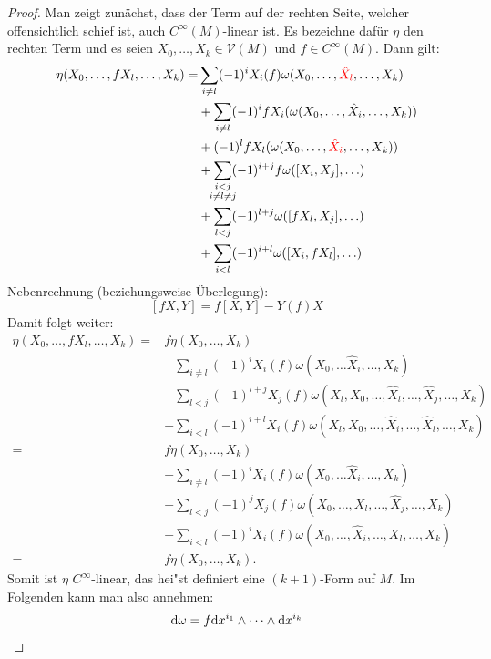 \begin{proof}
Man zeigt zunächst, dass der Term auf der rechten Seite, welcher offensichtlich schief ist, auch $C^{\infty}(M)$-linear ist.
Es bezeichne dafür $\eta$ den rechten Term und es seien $X_0, \ldots, X_k \in \mathcal V(M)$ und $f \in C^{\infty}(M)$. Dann gilt:
\begin{align*}
    \eta(X_0,\ldots,fX_l,\ldots, X_k) = & \sum_{i \neq l}(-1)^iX_i(f) \omega(X_0,\ldots, \textcolor{red}{\hat X_l}, \ldots, X_k)\\
& + \sum_{i \neq l}(-1)^ifX_i(\omega(X_0,\ldots, \hat X_i, \ldots, X_k))\\
& + (-1)^lfX_l(\omega(X_0, \ldots, \textcolor{red}{\hat X_i}, \ldots, X_k))\\ %
& + \sum_{\mathclap{\substack{i < j \\ i\ne l \ne j }}}(-1)^{i+j}f\omega([X_i,X_j], \ldots )\\ %
& + \sum_{l < j}(-1)^{l+j}\omega([fX_l,X_j], \ldots )\\
& + \sum_{i<l}(-1)^{i+l}\omega([X_i,fX_l], \ldots )
  \end{align*}
Nebenrechnung (beziehungsweise Überlegung):
	\[ [fX, Y] = f[X,Y] - Y(f)X \]
Damit folgt weiter:
\begin{align*}
  \eta(X_0,\ldots,fX_l,\ldots, X_k) = & f \eta(X_0,\ldots, X_k) \\
& + \sum_{i\neq l} (-1)^i X_i(f)\omega(X_0, \ldots \hat X_i, \ldots, X_k)\\
& - \sum_{l<j}(-1)^{l+j}X_j(f) \omega(X_l, X_0, \ldots, \hat X_l, \ldots, \hat X_j, \ldots, X_k)\\
& + \sum_{i<l}(-1)^{i+l}X_i(f) \omega(X_l, X_0, \ldots, \hat X_i, \ldots, \hat X_l, \ldots, X_k)\\
= & f \eta(X_0,\ldots, X_k) \\
& + \sum_{i\neq l} (-1)^i X_i(f)\omega(X_0, \ldots \hat X_i, \ldots, X_k)\\
& - \sum_{l<j}(-1)^{j}X_j(f) \omega(X_0, \ldots, X_l, \ldots, \hat X_j, \ldots, X_k)\\
& - \sum_{i<l}(-1)^{i}X_i(f) \omega(X_0, \ldots, \hat X_i, \ldots, X_l, \ldots, X_k)\\
= & f \eta(X_0,\ldots, X_k).
\end{align*}
Somit ist $\eta$ $C^{\infty}$-linear, das hei"st definiert eine $(k+1)$-Form auf $M$.
Im Folgenden kann man also annehmen:
\begin{align*}
  & \dop \omega = f \dop x^{i_1} \wedge \cdots \wedge \dop x^{i_k}\\

\end{align*}
\end{proof}
